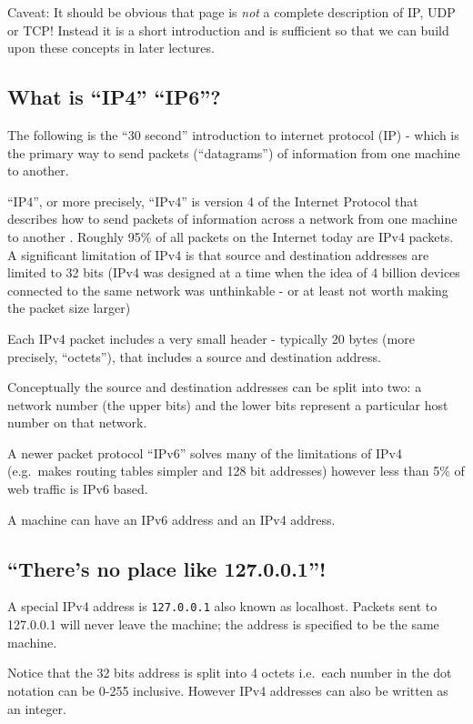 Caveat: It should be obvious that page is \emph{not} a complete
description of IP, UDP or TCP! Instead it is a short introduction and is
sufficient so that we can build upon these concepts in later lectures.

\subsection{\texorpdfstring{What is ``IP4''
``IP6''?}{What is IP4 IP6?}}\label{what-is-ip4-ip6}

The following is the ``30 second'' introduction to internet protocol
(IP) - which is the primary way to send packets (``datagrams'') of
information from one machine to another.

``IP4'', or more precisely, ``IPv4'' is version 4 of the Internet
Protocol that describes how to send packets of information across a
network from one machine to another . Roughly 95\% of all packets on the
Internet today are IPv4 packets. A significant limitation of IPv4 is
that source and destination addresses are limited to 32 bits (IPv4 was
designed at a time when the idea of 4 billion devices connected to the
same network was unthinkable - or at least not worth making the packet
size larger)

Each IPv4 packet includes a very small header - typically 20 bytes (more
precisely, ``octets''), that includes a source and destination address.

Conceptually the source and destination addresses can be split into two:
a network number (the upper bits) and the lower bits represent a
particular host number on that network.

A newer packet protocol ``IPv6'' solves many of the limitations of IPv4
(e.g.~makes routing tables simpler and 128 bit addresses) however less
than 5\% of web traffic is IPv6 based.

A machine can have an IPv6 address and an IPv4 address.

\subsection{\texorpdfstring{``There's no place like
127.0.0.1''!}{There's no place like 127.0.0.1!}}\label{theres-no-place-like-127.0.0.1}

A special IPv4 address is \texttt{127.0.0.1} also known as localhost.
Packets sent to 127.0.0.1 will never leave the machine; the address is
specified to be the same machine.

Notice that the 32 bits address is split into 4 octets i.e.~each number
in the dot notation can be 0-255 inclusive. However IPv4 addresses can
also be written as an integer.

